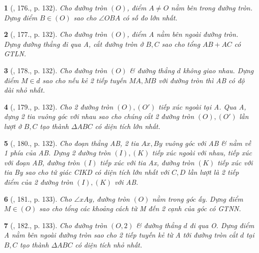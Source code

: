 \documentclass{article}
\newtheorem{baitoan}{}
\begin{document}
\begin{baitoan}[\cite{Binh_Toan_9_tap_1}, 176., p. 132]
	Cho đường tròn $(O)$, điểm $A\ne O$ nằm bên trong đường tròn. Dựng điểm $B\in(O)$ sao cho $\angle{OBA}$ có số đo lớn nhất.
\end{baitoan}

\begin{baitoan}[\cite{Binh_Toan_9_tap_1}, 177., p. 132]
	Cho đường tròn $(O)$, điểm A nằm bên ngoài đường tròn. Dựng đường thẳng đi qua A, cắt đường tròn ở $B,C$ sao cho tổng $AB + AC$ có {\rm GTLN}.
\end{baitoan}

\begin{baitoan}[\cite{Binh_Toan_9_tap_1}, 178., p. 132]
	Cho đường tròn $(O)$ \& đường thẳng $d$ không giao nhau. Dựng điểm $M\in d$ sao cho nếu  kẻ 2 tiếp tuyến $MA,MB$ với đường tròn thì AB có độ dài nhỏ nhất.
\end{baitoan}

\begin{baitoan}[\cite{Binh_Toan_9_tap_1}, 179., p. 132]
	Cho 2 đường tròn $(O),(O')$ tiếp xúc ngoài tại A. Qua A, dựng 2 tia vuông góc với nhau sao cho chúng cắt 2 đường tròn $(O),(O')$ lần lượt ở $B,C$ tạo thành $\Delta ABC$ có diện tích lớn nhất.
\end{baitoan}

\begin{baitoan}[\cite{Binh_Toan_9_tap_1}, 180., p. 132]
	Cho đoạn thẳng AB, 2 tia $Ax,By$ vuông góc với AB \& nằm về 1 phía của AB. Dựng 2 đường tròn $(I),(K)$ tiếp xúc ngoài với nhau, tiếp xúc với đoạn AB, đường tròn $(I)$ tiếp xúc với tia Ax, đường tròn $(K)$ tiếp xúc với tia By sao cho tứ giác CIKD có diện tích lớn nhất với $C,D$ lần lượt là 2 tiếp điểm của 2 đường tròn $(I),(K)$ với AB.
\end{baitoan}

\begin{baitoan}[\cite{Binh_Toan_9_tap_1}, 181., p. 133]
	Cho $\angle{xAy}$, đường tròn $(O)$ nằm trong góc ấy. Dựng điểm $M\in(O)$ sao cho tổng các khoảng cách từ M đến 2 cạnh của góc có {\rm GTNN}.
\end{baitoan}

\begin{baitoan}[\cite{Binh_Toan_9_tap_1}, 182., p. 133]
	Cho đường tròn $(O,2)$ \& đường thẳng $d$ đi qua O. Dựng điểm A nằm bên ngoài đường tròn sao cho 2 tiếp tuyến kẻ từ A tới đường tròn cắt $d$ tại $B,C$ tạo thành $\Delta ABC$ có diện tích nhỏ nhất.
\end{baitoan}
\end{document}
